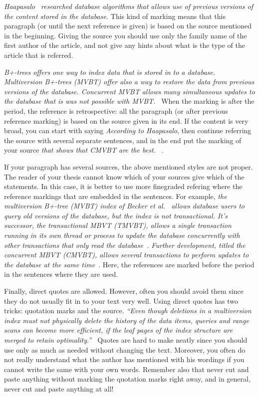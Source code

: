 \documentclass[12pt,a4paper,oneside,pdftex]{report}
\begin{document}
\emph{Haapasalo~\cite{HaapasaloThesis} researched database algorithms
  that allows use of previous versions of the content stored in the
  database.} This kind of marking means that this paragraph (or until
the next reference is given) is based on the source mentioned in the
beginning.  Giving the source you should use only the family name of
the first author of the article, and not give any hints about what is
the type of the article that is referred.

\emph{B+-trees offers one way to index data that is stored in to a
  database. Multiversion B+-trees (MVBT) offer also a way to restore
  the data from previous versions of the database. Concurrent MVBT
  allows many simultaneous updates to the database that is was not
  possible with MVBT.~\cite{HaapasaloThesis}} When the marking is
after the period, the reference is retrospective: all the paragraph
(or after previous reference marking) is based on the source given in
its end. If the content is very broad, you can start with saying
\emph{According to Haapasalo}, then continue referring the source with
several separate sentences, and in the end put the marking of your
source \emph{ that shows that CMVBT are the
  best. ~\cite{HaapasaloThesis}}.

If your paragraph has several sources, the above mentioned styles are
not proper. The reader of your thesis cannot know which of your
sources give which of the statements. In this case, it is better to
use more finegraded refering where the reference markings that are
embedded in the sentences. For example, \emph{the multiversion B+-tree
  (MVBT) index of Becker et al.~\cite{becker:1996:mvbt} allows database
  users to query old versions of the database, but the index is not
  transactional.
  It's successor, the transactional MBVT (TMVBT), allows a single transaction
  running in its own thread or process to update the database concurrently
  with other transactions that only read the
  database~\cite{haapasalo:2009:tmvbt}.
  Further development, titled the concurrent MBVT (CMVBT),
  allows several transactions to perform updates to the database at the same
  time~\cite{HaapasaloThesis}}.
  Here, the references are marked before
  the period in the sentences where they are used.

Finally, direct quotes are allowed. However, often you should avoid
them since they do not usually fit in to your text very well. Using
direct quotes has two tricks: quotation marks and the source.  \emph{
  ``Even though deletions in a multiversion index must not physically
  delete the history of the data items, queries and range scans can
  become more efficient, if the leaf pages of the index structure are
  merged to retain optimality.''~\cite{HaapasaloThesis}} Quotes are
hard to make neatly since you should use only as much as needed
without changing the text. Moreover, you often do not really
understand what the author has mentioned with his wordings if you
cannot write the same with your own words. Remember also that never
cut and paste anything without marking the quotation marks right away,
and in general, never cut and paste anything at all!
\end{document}
